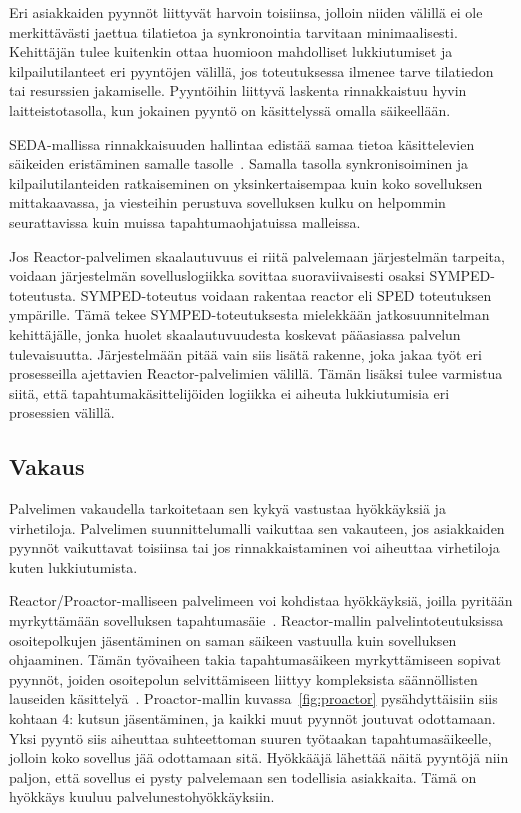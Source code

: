 \documentclass[finnish]{tktltiki2}%
\theoremstyle{definition}
\theoremstyle{remark}
\begin{document}
Eri asiakkaiden pyynnöt liittyvät harvoin toisiinsa,
jolloin niiden välillä ei ole merkittävästi jaettua tilatietoa ja
synkronointia tarvitaan minimaalisesti.
Kehittäjän tulee kuitenkin ottaa huomioon mahdolliset lukkiutumiset
ja kilpailutilanteet eri pyyntöjen välillä, jos
toteutuksessa ilmenee tarve tilatiedon tai resurssien jakamiselle.
Pyyntöihin liittyvä laskenta rinnakkaistuu hyvin laitteistotasolla,
kun jokainen pyyntö on käsittelyssä omalla säikeellään.

SEDA-mallissa rinnakkaisuuden hallintaa edistää
samaa tietoa käsittelevien säikeiden eristäminen samalle tasolle~\cite{welsh_seda_2001}.
Samalla tasolla synkronisoiminen ja kilpailutilanteiden ratkaiseminen on
yksinkertaisempaa kuin koko sovelluksen mittakaavassa, ja
viesteihin perustuva sovelluksen kulku on helpommin seurattavissa kuin
muissa tapahtumaohjatuissa malleissa.

Jos Reactor-palvelimen skaalautuvuus ei riitä palvelemaan
järjestelmän tarpeita, voidaan järjestelmän sovelluslogiikka
sovittaa suoraviivaisesti osaksi SYMPED-toteutusta. SYMPED-toteutus
voidaan rakentaa reactor eli SPED toteutuksen ympärille. Tämä
tekee SYMPED-toteutuksesta mielekkään jatkosuunnitelman kehittäjälle,
jonka huolet skaalautuvuudesta koskevat pääasiassa palvelun tulevaisuutta.
Järjestelmään pitää vain siis lisätä rakenne, joka
jakaa työt eri prosesseilla ajettavien Reactor-palvelimien välillä.
Tämän lisäksi tulee varmistua siitä, että tapahtumakäsittelijöiden
logiikka ei aiheuta lukkiutumisia eri prosessien välillä.

\subsection{Vakaus}
Palvelimen vakaudella tarkoitetaan sen kykyä vastustaa hyökkäyksiä ja
virhetiloja.
Palvelimen suunnittelumalli vaikuttaa sen vakauteen, jos asiakkaiden
pyynnöt vaikuttavat toisiinsa tai jos rinnakkaistaminen voi aiheuttaa virhetiloja kuten
lukkiutumista.

Reactor/Proactor-malliseen palvelimeen voi kohdistaa hyökkäyksiä, joilla pyritään
myrkyttämään sovelluksen tapahtumasäie~\cite{davis_case_2017}. Reactor-mallin palvelintoteutuksissa
osoitepolkujen jäsentäminen on saman säikeen vastuulla kuin sovelluksen ohjaaminen.
Tämän työvaiheen takia
tapahtumasäikeen myrkyttämiseen sopivat pyynnöt,
joiden osoitepolun selvittämiseen liittyy kompleksista
säännöllisten lauseiden käsittelyä~\cite{davis_case_2017}.
Proactor-mallin kuvassa~\ref{fig:proactor} pysähdyttäisiin 
siis kohtaan 4: kutsun jäsentäminen, ja
kaikki muut pyynnöt joutuvat odottamaan.
Yksi pyyntö siis aiheuttaa suhteettoman suuren työtaakan
tapahtumasäikeelle, jolloin koko sovellus jää odottamaan sitä.
Hyökkääjä lähettää näitä pyyntöjä niin paljon, että sovellus
ei pysty palvelemaan sen todellisia asiakkaita. Tämä
on hyökkäys kuuluu palvelunestohyökkäyksiin.
\end{document}
